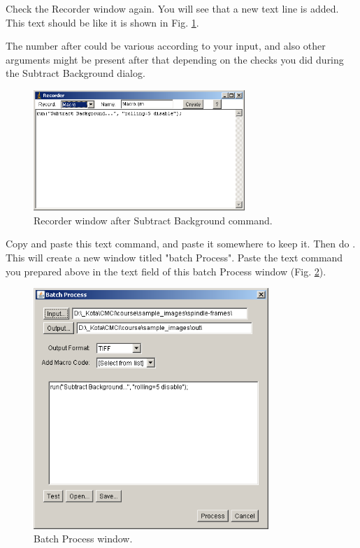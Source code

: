 \begin{indentexercise}{1}
Check the Recorder window again. You will see that a new text line is
added. This text should be like it is shown in Fig. \ref{fig:img73}.

\begin{quote}
\end{quote}

The number after  could be
various according to your input, and also other arguments might be
present after that depending on the checks you did during the Subtract
Background dialog. 
\begin{figure}[htbp]
\begin{center}
\includegraphics[width=8cm]{fig/CMCIBasicCourse201102-img73.png}
\caption{ Recorder window after Subtract Background command.}
\label{fig:img73}
\end{center}
\end{figure}

Copy and paste this text command, and paste it somewhere to keep it.
Then do . This will create a new window titled
"batch Process". Paste the text
command you prepared above in the text field of this batch Process
window (Fig. \ref{fig:img74}). 

\begin{figure}[htbp]
\begin{center}
\includegraphics[width=8.881cm,height=9.116cm]{fig/CMCIBasicCourse201102-img74.png}
\caption{ Batch Process window.}
\label{fig:img74}
\end{center}
\end{figure}



\end{indentexercise}
